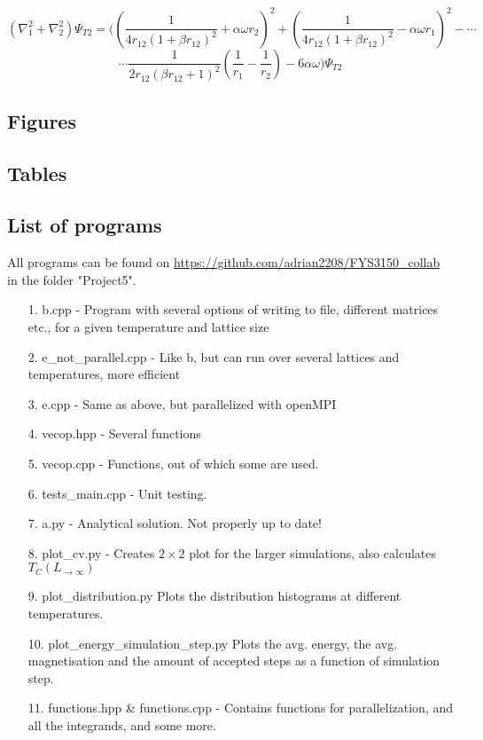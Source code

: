 \documentclass[10pt,a4paper]{article}
\begin{document}
\[
\left( \nabla_1^2+\nabla_2^2 \right)\Psi_{T2} = \Bigg( \left( \frac{1}{4r_{12}\left( 1+\beta r_{12} \right)^2} +\alpha \omega r_2\right)^2 +\left( \frac{1}{4r_{12}\left( 1+\beta r_{12} \right)^2} -\alpha \omega r_1\right)^2- \cdots
\]
\[ 
\cdots \dfrac{1}{2r_{12}\left(\beta r_{12}+1\right)^2}\left( \frac{1}{r_1}-\frac{1}{r_2} \right)-6\alpha \omega \Bigg)\Psi_{T2}
\]
\subsection{Figures}

\subsection{Tables}

\subsection{List of programs}\label{Listofprograms}
All programs can be found on \url{https://github.com/adrian2208/FYS3150_collab} in the folder "Project5".


\begin{itemize}
\item[1.] b.cpp - Program with several options of writing to file, different matrices etc., for a given temperature and lattice size
\item[2.] e\_not\_parallel.cpp - Like b, but can run over several lattices and temperatures, more efficient
\item[3.] e.cpp - Same as above, but parallelized with openMPI
\item[4.] vecop.hpp - Several functions
\item[5.] vecop.cpp - Functions, out of which some are used.
\item[6.] tests\_main.cpp - Unit testing.
\item[7.] a.py - Analytical solution. Not properly up to date!
\item[8.] plot\_cv.py - Creates $2\times2$ plot for the larger simulations, also calculates $T_C(L_{\rightarrow \infty})$
\item[9.] plot\_distribution.py Plots the distribution histograms at different temperatures.
\item[10.] plot\_energy\_simulation\_step.py Plots the  avg. energy, the avg. magnetisation and the amount of accepted steps as a function of simulation step.
\item[11.] functions.hpp \& functions.cpp - Contains functions for parallelization, and all the integrands, and some more.
\end{itemize}
\end{document}
